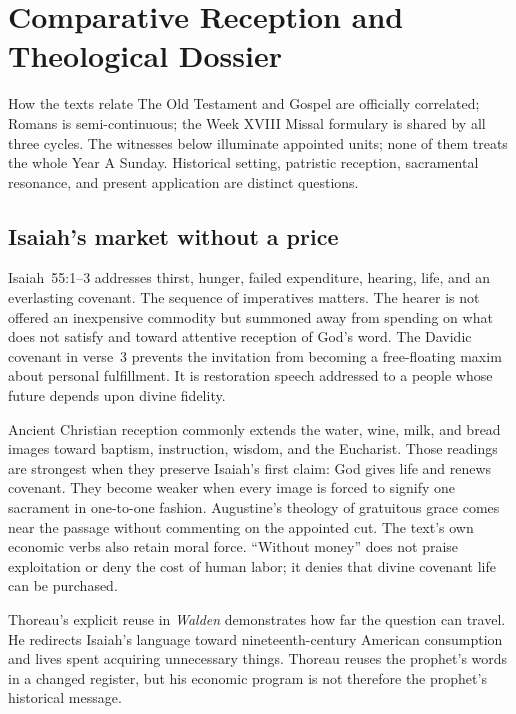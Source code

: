 \section*{Comparative Reception and Theological Dossier}

\begin{studybox}{How the texts relate}
The Old Testament and Gospel are officially correlated; Romans is
semi-continuous; the Week XVIII Missal formulary is shared by all three cycles.
The witnesses below illuminate appointed units; none of them treats the
whole Year A Sunday. Historical setting, patristic reception,
sacramental resonance, and present application are distinct questions.
\end{studybox}

\subsection*{Isaiah's market without a price}

Isaiah~55:1--3 addresses thirst, hunger, failed expenditure, hearing, life, and
an everlasting covenant. The sequence of imperatives matters. The hearer is
not offered an inexpensive commodity but summoned away from spending on what
does not satisfy and toward attentive reception of God's word. The Davidic
covenant in verse~3 prevents the invitation from becoming a free-floating
maxim about personal fulfillment. It is restoration speech addressed to a
people whose future depends upon divine fidelity.

Ancient Christian reception commonly extends the water, wine, milk, and bread
images toward baptism, instruction, wisdom, and the Eucharist. Those readings
are strongest when they preserve Isaiah's first claim: God gives life and
renews covenant. They become weaker when every image is forced to signify one
sacrament in one-to-one fashion. Augustine's theology of gratuitous grace comes near
the passage without commenting on the appointed cut. The text's own economic verbs also retain moral force. ``Without money''
does not praise exploitation or deny the cost of human labor; it denies that
divine covenant life can be purchased.

Thoreau's explicit reuse in \emph{Walden} demonstrates how far the question can
travel. He redirects Isaiah's language toward nineteenth-century American
consumption and lives spent acquiring unnecessary things. Thoreau reuses the prophet's words in a changed register, but his economic
program is not therefore the prophet's historical message.

